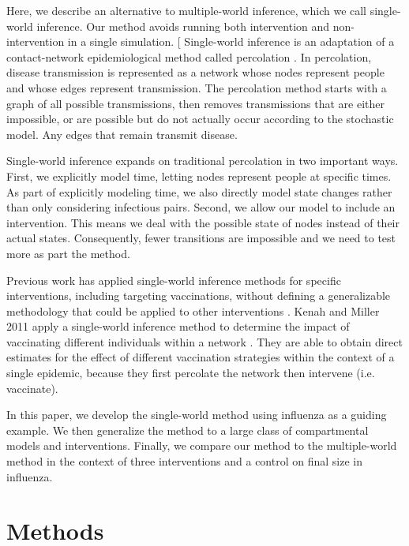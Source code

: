 \documentclass[openacc]{rsproca_new}%
\begin{document}
Here, we describe an alternative to multiple-world inference, which we call single-world inference.
Our method avoids running both intervention and non-intervention in a single simulation.  [
Single-world inference is an adaptation of a contact-network epidemiological method called percolation \cite{miller-book}.
In percolation, disease transmission is represented as a network whose nodes represent people and whose edges represent transmission.
The percolation method starts with a graph of all possible transmissions, then removes transmissions that are either impossible, or are possible but do not actually occur according to the stochastic model.
Any edges that remain transmit disease.

Single-world inference expands on traditional percolation in two important ways.
First, we explicitly model time, letting nodes represent people at specific times.
As part of explicitly modeling time, we also directly model state changes rather than only considering infectious pairs.
Second, we allow our model to include an intervention.
This means we deal with the possible state of nodes instead of their actual states.
Consequently, fewer transitions are impossible and we need to test more as part the method.

Previous work has applied single-world inference methods for specific interventions, including targeting vaccinations, without defining a generalizable methodology that could be applied to other interventions \cite{kenah-miller:2011}.
Kenah and Miller 2011 apply a single-world inference method to determine the impact of vaccinating different individuals within a network \cite{kenah-miller:2011}.
They are able to obtain direct estimates for the effect of different vaccination strategies within the context of a single epidemic, because they first percolate the network then intervene (i.e. vaccinate).

In this paper, we develop the single-world method using influenza as a guiding example.
We then generalize the method to a large class of compartmental models and interventions.
Finally, we compare our method to the multiple-world method in the context of three interventions and a control on final size in influenza.

\section{Methods}
\end{document}
